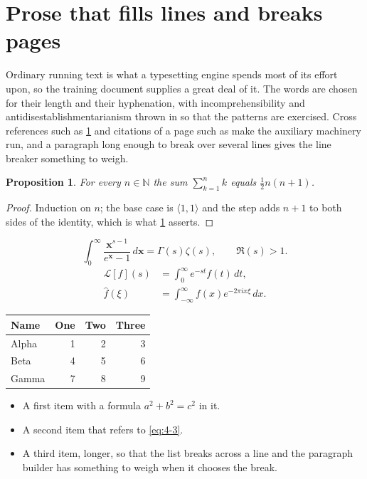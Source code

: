 \documentclass[11pt,a4paper]{report}
\theoremstyle{plain}
\newtheorem{proposition}{Proposition}[chapter]
\newcommand{\vecn}[1]{\mathbf{#1}}
\newcommand{\pairs}[2]{\langle #1,#2\rangle}
\begin{document}
\section{Prose that fills lines and breaks pages}
\label{sec:prose4-3}
Ordinary running text is what a typesetting engine spends most of its effort
upon, so the training document supplies a great deal of it. The words are
chosen for their length and their hyphenation, with incomprehensibility and
antidisestablishmentarianism thrown in so that the patterns are exercised.
Cross references such as \cref{sec:prose4-3} and citations of a page such
as \pageref{sec:prose4-3} make the auxiliary machinery run, and a
paragraph long enough to break over several lines gives the line breaker
something to weigh.
\begin{proposition}\label{prop:4-3}
For every $n\in\mathbb{N}$ the sum $\sum_{k=1}^{n}k$ equals
$\tfrac{1}{2}n(n+1)$.
\end{proposition}
\begin{proof}
Induction on $n$; the base case is $\pairs{1}{1}$ and the step adds $n+1$ to
both sides of the identity, which is what \cref{prop:4-3} asserts.
\end{proof}
\begin{equation}\label{eq:4-3}
  \int_{0}^{\infty}\frac{\vecn{x}^{s-1}}{e^{\vecn{x}}-1}\,d\vecn{x}
    = \Gamma(s)\zeta(s),\qquad \Re(s)>1 .
\end{equation}
\begin{align}
  \mathcal{L}[f](s) &= \int_{0}^{\infty} e^{-st} f(t)\,dt, \\
  \widehat{f}(\xi)  &= \int_{-\infty}^{\infty} f(x) e^{-2\pi i x\xi}\,dx .
\end{align}
\par\noindent\begin{center}
\begin{tabular}{lrrr}
\hline
Name & One & Two & Three \\
\hline
Alpha & 1 & 2 & 3 \\
Beta & 4 & 5 & 6 \\
Gamma & 7 & 8 & 9 \\
\hline
\end{tabular}
\end{center}
\begin{itemize}
  \item A first item with a formula $a^2+b^2=c^2$ in it.
  \item A second item that refers to \eqref{eq:4-3}.
  \item A third item, longer, so that the list breaks across a line and the
    paragraph builder has something to weigh when it chooses the break.
\end{itemize}
\end{document}
